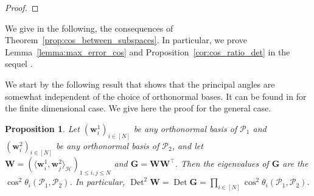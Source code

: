\documentclass[twoside,11pt]{book}
\newtheorem{proposition}{Proposition}
\numberwithin{theorem}{chapter}
\numberwithin{definition}{chapter}
\numberwithin{proposition}{chapter}
\numberwithin{corollary}{chapter}
\numberwithin{example}{chapter}
\numberwithin{lemma}{chapter}
\numberwithin{assumption}{chapter}
\numberwithin{equation}{chapter}
\numberwithin{figure}{chapter}
\DeclareMathOperator{\Det}{Det}
\DeclareMathOperator{\Tran}{\intercal}
\begin{document}
\begin{proof}
\end{proof}
We give in the following, the consequences of Theorem~\ref{prop:cos_between_subspaces}. In particular, we prove Lemma~\ref{lemma:max_error_cos} and Proposition~\ref{cor:cos_ratio_det} in the sequel
.

We start by the following result that shows that the principal angles are somewhat independent of the choice of orthonormal bases. It can be found in \cite{BjGo73,MiBe92} for the finite dimensional case. We give here the proof for the general case.
\begin{proposition}\label{prop:cos_det_relationship}
Let $(\bm{w}^{1}_{i})_{i \in [N]}$ be any orthonormal basis of $\mathcal{P}_{1}$ and $(\bm{w}^{2}_{i})_{i \in [N]}$ be any orthonormal basis of $\mathcal{P}_{2}$, and let $\bm{W} = (\langle \bm{w}^{1}_{i},\bm{w}^{2}_{j} \rangle_{\mathcal{H}})_{1\leq i,j \leq N}$ and $\bm{G} = \bm{W}\bm{W}^{\Tran}$. Then
the eigenvalues of $\bm{G}$ are the $\cos^{2} \theta_{i}(\mathcal{P}_{1},\mathcal{P}_{2})$. In particular, $\Det^{2} \bm{W} = \Det \bm{G} =  \prod\limits_{i \in [N]} \cos^{2} \theta_{i}(\mathcal{P}_{1},\mathcal{P}_{2})$.
\end{proposition}
\end{document}
